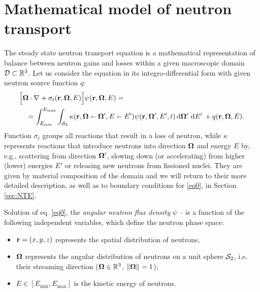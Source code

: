 \ifpdf
	\graphicspath{{2/pic/PNG/}{2/pic/PDF/}{2/pic/}}
\else
	\graphicspath{{2/pic/EPS/}{2/pic/}}
\fi

\chapter{Mathematical model of neutron transport}\label{chap:nte-review}


The steady state neutron transport equation is a mathematical representation of balance between neutron gains and losses
within a given macroscopic domain $\VV\subset\R[3]$. Let us consider the equation in its
integro-differential form with given neutron source function $q$:
\begin{equation}\label{eq0}
  \begin{multlined}
    \Bigl[
      \bomega\cdot\grad + \sigma_t(\br,\bomega,E)
    \Bigr]
    \psi(\br,\bomega,E) =\\
    = \intE[']{\Emin}{\Emax}{\intA[']{\kappa(\br,\bomega\sla\bomega',E\sla E')\psi(\br,\bomega',E',t)}}  + 
    \src(\br,\bomega,E).
  \end{multlined}  
\end{equation}
Function $\sigma_t$ groups all reactions that result in a loss of neutron,
while $\kappa$\index{$\kappa$} represents reactions that introduce neutrons into direction $\bomega$ and energy $E$ by,
e.g., scattering from direction $\bomega'$, slowing down (or accelerating) from higher (lower) energies $E'$ or releasing new neutrons from fissioned nuclei.
They are given by material composition of the domain and we will return to their more detailed description, as
well as to boundary conditions for \eqref{eq0}, in Section \ref{sec:NTE}.

Solution of eq. \eqref{eq0}, the \textit{angular neutron flux density} $\psi$ -- is a function of the following independent variables, which define the neutron
phase space:
\begin{itemize}
 	\item $\br = (x,y,z)$	
 	 represents the spatial distribution of
 	 neutrons,
 	\item $\bomega$
 	represents the angular distribution of neutrons on a unit sphere $\Sphere$, i.e. their streaming direction ($\bomega\in\R[3]$, $\norm{\bomega}=1$);
 	\item $E\in [E_{\text{min}},E_{\text{max}}]$ is the
 	kinetic energy of neutrons.
\end{itemize}

